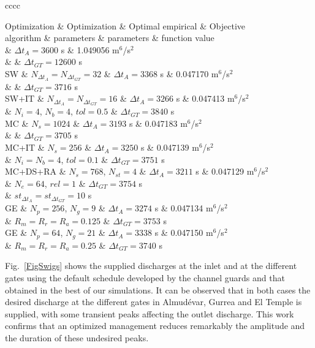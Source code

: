 \documentclass[review,authoryear]{elsarticle}
\newcommand{\TABLE}[5]
{
	\begin{table}[ht!]
		\centering
		\caption{#4.\label{#5}}
		#1
		\tabulinesep=0.9mm
		\begin{tabu}{#2}
			#3
		\end{tabu}
	\end{table}
}
\begin{document}
\TABLE{\footnotesize}{cccc}
{
	Optimization & Optimization & Optimal empirical & Objective
	\\ algorithm & parameters & parameters & function value
	\\ \hline
	\multicolumn{2}{c}{Manual management} & $\Delta t_A=3600$ s
	& 1.049056 m$^6$/s$^2$
	\\ & & $\Delta t_{GT}=12600$ s
	\\ \hline
	SW & $N_{\Delta t_A}=N_{\Delta t_{GT}}=32$ & $\Delta t_A=3368$ s
	& 0.047170 m$^6$/s$^2$
	\\ & & $\Delta t_{GT}=3716$ s
	\\ \hline
	SW+IT & $N_{\Delta t_A}=N_{\Delta t_{GT}}=16$ & $\Delta t_A=3266$ s
	& 0.047413 m$^6$/s$^2$
	\\ & $N_i=4$, $N_b=4$, $tol=0.5$ & $\Delta t_{GT}=3840$ s
	\\ \hline
	MC & $N_s=1024$ & $\Delta t_A=3193$ s & 0.047183 m$^6$/s$^2$
	\\ & & $\Delta t_{GT}=3705$ s
	\\ \hline
	MC+IT & $N_s=256$ & $\Delta t_A=3250$ s & 0.047139 m$^6$/s$^2$
	\\ & $N_i=N_b=4$, $tol=0.1$ & $\Delta t_{GT}=3751$ s
	\\ \hline
	MC+DS+RA & $N_s=768$, $N_{st}=4$ & $\Delta t_A=3211$ s
		& 0.047129 m$^6$/s$^2$
	\\ & $N_e=64$, $rel=1$ & $\Delta t_{GT}=3754$ s
	\\ & $st_{\Delta t_A}=st_{\Delta t_{GT}}=10$ s 
	\\ \hline
	GE & $N_p=256$, $N_g=9$ & $\Delta t_A=3274$ s & 0.047134 m$^6$/s$^2$
	\\ & $R_m=R_r=R_a=0.125$ & $\Delta t_{GT}=3753$ s
	\\ \hline
	GE & $N_p=64$, $N_g=21$ & $\Delta t_A=3338$ s & 0.047150 m$^6$/s$^2$
	\\ & $R_m=R_r=R_a=0.25$ & $\Delta t_{GT}=3740$ s
	\\ \hline
}{Optimal empirical parameters and value of the evaluation function in the simulation of the Canal de Violada using program SWIGS and several optimization algorithms in MPCOTool with the same total number of simulations ($N_{total}=1024$)}
{TabSwigs}

Fig.~\ref{FigSwigs} shows the supplied discharges at the inlet and at the
different gates using the default schedule developed by the channel guards and
that obtained in the best of our simulations. It can be observed that in both
cases the desired discharge at the different gates in Almudévar, Gurrea and El
Temple is supplied, with some transient peaks affecting the outlet discharge.
This work confirms that an optimized management reduces remarkably the amplitude
and the duration of these undesired peaks.
\end{document}

